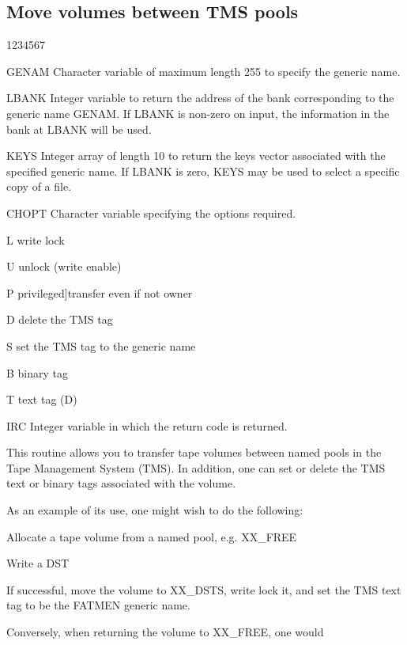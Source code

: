 \subsection{Move volumes between TMS pools}
\begin{DLtt}{1234567}
\item[GENAM]
Character variable of maximum length 255 to specify the generic name.
\item[LBANK]
Integer variable to return the address of the bank corresponding
to the generic name GENAM.
If LBANK is non-zero on input, the information in the 
bank at LBANK will be used.
\item[KEYS]
Integer array of length 10 to return the keys vector associated
with the specified generic name.
If LBANK is zero, KEYS may be used to select a specific
copy of a file.
\item[CHOPT]
Character variable specifying the options required.
\begin{DLtt}{12}
\item[L]write lock
\item[U]unlock (write enable)
\item[P]privileged]transfer even if not owner
\item[D]delete the TMS tag
\item[S]set the TMS tag to the generic name
\item[B]binary tag
\item[T]text  tag (D)
\end{DLtt}
\item[IRC]
Integer variable in which the return code is returned.
\end{DLtt}
\par
This routine allows you to transfer tape volumes between named pools
in the Tape Management System (TMS). In addition, one can set or delete
the TMS text or binary tags associated with the volume.
\par
As an example of its use, one might wish to do the following:
\begin{UL}
\item
Allocate a tape volume from a named pool, e.g. XX\_FREE
\item
Write a DST
\item
If successful, move the volume to XX\_DSTS, write lock it,
and set the TMS text tag to be the FATMEN generic name.
\end{UL}
\par
Conversely, when returning the volume to XX\_FREE, one would
